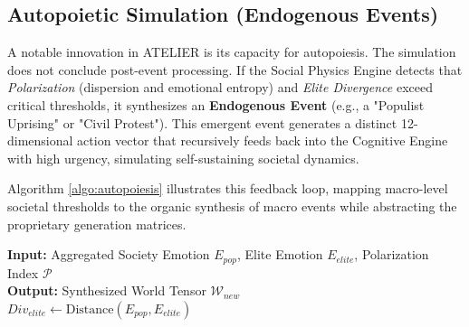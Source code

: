 \documentclass[12pt]{IEEEtran}
\begin{document}
\subsection{Autopoietic Simulation (Endogenous Events)}
A notable innovation in ATELIER is its capacity for autopoiesis. The simulation does not conclude post-event processing. If the Social Physics Engine detects that \textit{Polarization} (dispersion and emotional entropy) and \textit{Elite Divergence} exceed critical thresholds, it synthesizes an \textbf{Endogenous Event} (e.g., a "Populist Uprising" or "Civil Protest"). This emergent event generates a distinct 12-dimensional action vector that recursively feeds back into the Cognitive Engine with high urgency, simulating self-sustaining societal dynamics.

Algorithm \ref{algo:autopoiesis} illustrates this feedback loop, mapping macro-level societal thresholds to the organic synthesis of macro events while abstracting the proprietary generation matrices.

\begin{algorithm}
\caption{Autopoietic Endogenous Event Synthesis}
\label{algo:autopoiesis}
\SetAlgoLined
\textbf{Input:} Aggregated Society Emotion $E_{pop}$, Elite Emotion $E_{elite}$, Polarization Index $\mathcal{P}$ \\
\textbf{Output:} Synthesized World Tensor $\mathcal{W}_{new}$ \\
$Div_{elite} \gets \text{Distance}(E_{pop}, E_{elite})$ \\
\end{algorithm}
\end{document}
